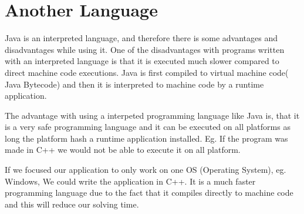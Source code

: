 \section{Another Language}
Java is an interpreted language, and therefore there is some advantages and disadvantages while using it. One of the disadvantages with programs written with an interpreted language is that it is executed much slower compared to direct machine code executions. Java is first compiled to virtual machine code( Java Bytecode) and then it is interpreted to machine code by a runtime application.

The advantage with using a interpeted programming language like Java is, that it is a very safe programming language and it can be executed on all platforms as long the platform hash a runtime application installed. Eg. If the program was made in C++ we would not be able to execute it on all platform.

If we focused our application to only work on one OS (Operating System), eg. Windows, We could write the application in C++. It is a much faster programming language due to the fact that it compiles directly to machine code and this will reduce our solving time.